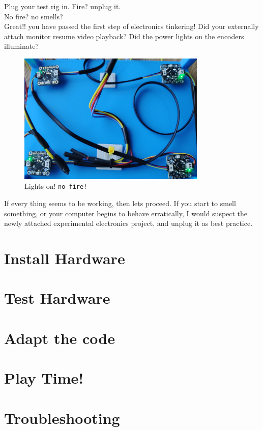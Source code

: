 \documentclass[]{article}
\begin{document}
Plug your test rig in. Fire? unplug it.\\No fire? no smells? \\ Great!! you have passed the first step of electronics tinkering!
Did your externally attach monitor resume video playback? Did the power lights on the encoders illuminate?

\begin{figure}[ht]
	\centering
	\includegraphics[width=0.8\textwidth]{noFire.png}
	\caption{Lights on! \texttt{no fire!} }
	\label{fig:looks_good}
\end{figure}

If every thing seems to be working, then lets proceed. 
If you start to smell something, or your computer begins to behave erratically, I would suspect the newly attached experimental electronics project, and unplug it as best practice. 
 
\section*{Install Hardware}
\section*{Test Hardware}

\section*{Adapt the code}

\section*{Play Time!}

\section*{Troubleshooting}
\end{document}
